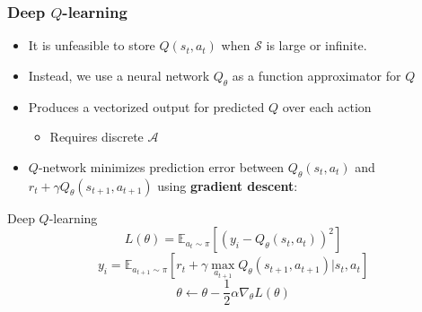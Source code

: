 \documentclass{beamer}
\begin{document}
\begin{frame}
  \frametitle{Deep $Q$-learning}
  \begin{itemize}
    \item It is unfeasible to store $Q(s_t, a_t)$ when $\mathcal{S}$ is large or infinite.
    \item Instead, we use a neural network $Q_\theta$ as a function approximator for $Q$
    \item Produces a vectorized output for predicted $Q$ over each action
    \begin{itemize}
      \item Requires discrete $\mathcal{A}$
    \end{itemize}
    \item $Q$-network minimizes prediction error between $Q_\theta(s_t, a_t)$ and $r_t + \gamma Q_\theta(s_{t+1}, a_{t+1})$ using \textbf{gradient descent}:
  \end{itemize}
  \begin{exampleblock}{Deep $Q$-learning}
    \begin{equation*}
          L(\theta) = \mathbb{E}_{a_t \sim \pi} \left[ \left(y_i - Q_\theta(s_t, a_t) \right)^2 \right]
    \end{equation*}
    \begin{equation*}
      y_i = \mathbb{E}_{a_{t+1} \sim \pi} \left[ r_t + \gamma \max_{a_{t+1}} Q_\theta (s_{t+1}, a_{t+1}) \vert s_t, a_t \right]
    \end{equation*}
    \begin{equation*}
      \theta \gets \theta - \frac{1}{2} \alpha \nabla_\theta L(\theta)
    \end{equation*}
  \end{exampleblock}
\end{frame}
\end{document}
